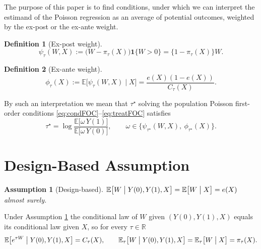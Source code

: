 \documentclass[11pt]{article}
\newtheorem{assumption}{Assumption}
\theoremstyle{definition}
\newtheorem{definition}{Definition}
\theoremstyle{plain}
\newcommand{\E}{\mathbb{E}}
\newcommand{\1}{\mathbf{1}}
\newcommand{\R}{\mathbb{R}}
\begin{document}
The purpose of this paper is to find conditions, under which we can interpret the estimand of the Poisson regression as an average of potential outcomes, weighted by the ex-post or the ex-ante weight.

\begin{definition}[Ex-post weight]
\label{def:expost}
\begin{equation}
\psi_\tau(W,X):=\bigl(W-\pi_\tau(X)\bigr)\1\{W>0\}=\bigl\{1-\pi_\tau(X)\bigr\}W .
\label{eq:defexpost}
\end{equation}
\end{definition}

\begin{definition}[Ex-ante weight]
\label{def:exante}
\begin{equation}
\phi_\tau(X):=\E\bigl[\psi_\tau(W,X)\mid X\bigr]=\frac{e(X)(1-e(X))}{C_\tau(X)} .
\label{eq:defexante}
\end{equation}
\end{definition}

By such an interpretation we mean that $\tau^\star$ solving the population Poisson first-order conditions \eqref{eq:condFOC}--\eqref{eq:treatFOC} satisfies
\[
\tau^\star=\log\frac{\E\bigl[\omega\,Y(1)\bigr]}{\E\bigl[\omega\,Y(0)\bigr]},
\qquad
\omega\in\bigl\{\psi_{\tau^\star}(W,X),\ \phi_{\tau^\star}(X)\bigr\}.
\]

\section{Design-Based Assumption}

\begin{assumption}[Design-based]
\label{as:design}
$\E\bigl[W\bigm| Y(0),Y(1),X\bigr]=\E\bigl[W\bigm| X\bigr]=e(X)$ almost surely.
\end{assumption}

Under Assumption \ref{as:design} the conditional law of $W$ given $(Y(0),Y(1),X)$ equals its conditional law given $X$, so for every $\tau\in\R$
\begin{equation}
\E\bigl[e^{\tau W}\bigm| Y(0),Y(1),X\bigr]=C_\tau(X),
\qquad
\E_\tau\bigl[W\bigm| Y(0),Y(1),X\bigr]=\E_\tau\bigl[W\bigm| X\bigr]=\pi_\tau(X).
\label{eq:designtilt}
\end{equation}
\end{document}
